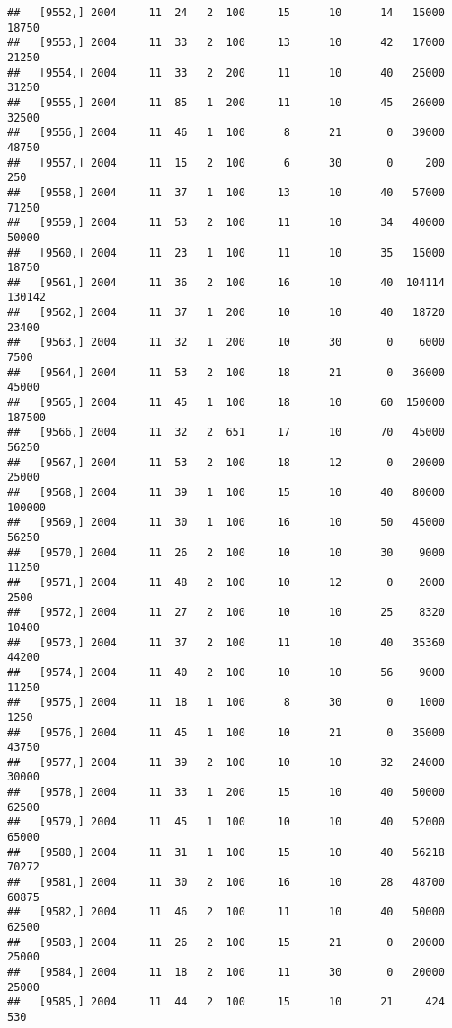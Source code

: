 \documentclass{article}\usepackage[]{graphicx}\usepackage[]{color}
\makeatletter
\newenvironment{kframe}{%
 \def\at@end@of@kframe{}%
 \ifinner\ifhmode%
  \def\at@end@of@kframe{\end{minipage}}%
  \begin{minipage}{\columnwidth}%
 \fi\fi%
 \def\FrameCommand##1{\hskip\@totalleftmargin \hskip-\fboxsep
 \colorbox{shadecolor}{##1}\hskip-\fboxsep
     \hskip-\linewidth \hskip-\@totalleftmargin \hskip\columnwidth}%
 \MakeFramed {\advance\hsize-\width
   \@totalleftmargin\z@ \linewidth\hsize
   \@setminipage}}%
 {\par\unskip\endMakeFramed%
 \at@end@of@kframe}
\newenvironment{knitrout}{}{} %
\makeatother
\begin{document}
\begin{knitrout}
\begin{kframe}
\begin{verbatim}
##   [9552,] 2004     11  24   2  100     15      10      14   15000   18750
##   [9553,] 2004     11  33   2  100     13      10      42   17000   21250
##   [9554,] 2004     11  33   2  200     11      10      40   25000   31250
##   [9555,] 2004     11  85   1  200     11      10      45   26000   32500
##   [9556,] 2004     11  46   1  100      8      21       0   39000   48750
##   [9557,] 2004     11  15   2  100      6      30       0     200     250
##   [9558,] 2004     11  37   1  100     13      10      40   57000   71250
##   [9559,] 2004     11  53   2  100     11      10      34   40000   50000
##   [9560,] 2004     11  23   1  100     11      10      35   15000   18750
##   [9561,] 2004     11  36   2  100     16      10      40  104114  130142
##   [9562,] 2004     11  37   1  200     10      10      40   18720   23400
##   [9563,] 2004     11  32   1  200     10      30       0    6000    7500
##   [9564,] 2004     11  53   2  100     18      21       0   36000   45000
##   [9565,] 2004     11  45   1  100     18      10      60  150000  187500
##   [9566,] 2004     11  32   2  651     17      10      70   45000   56250
##   [9567,] 2004     11  53   2  100     18      12       0   20000   25000
##   [9568,] 2004     11  39   1  100     15      10      40   80000  100000
##   [9569,] 2004     11  30   1  100     16      10      50   45000   56250
##   [9570,] 2004     11  26   2  100     10      10      30    9000   11250
##   [9571,] 2004     11  48   2  100     10      12       0    2000    2500
##   [9572,] 2004     11  27   2  100     10      10      25    8320   10400
##   [9573,] 2004     11  37   2  100     11      10      40   35360   44200
##   [9574,] 2004     11  40   2  100     10      10      56    9000   11250
##   [9575,] 2004     11  18   1  100      8      30       0    1000    1250
##   [9576,] 2004     11  45   1  100     10      21       0   35000   43750
##   [9577,] 2004     11  39   2  100     10      10      32   24000   30000
##   [9578,] 2004     11  33   1  200     15      10      40   50000   62500
##   [9579,] 2004     11  45   1  100     10      10      40   52000   65000
##   [9580,] 2004     11  31   1  100     15      10      40   56218   70272
##   [9581,] 2004     11  30   2  100     16      10      28   48700   60875
##   [9582,] 2004     11  46   2  100     11      10      40   50000   62500
##   [9583,] 2004     11  26   2  100     15      21       0   20000   25000
##   [9584,] 2004     11  18   2  100     11      30       0   20000   25000
##   [9585,] 2004     11  44   2  100     15      10      21     424     530

\end{verbatim}
\end{kframe}
\end{knitrout}
\end{document}

